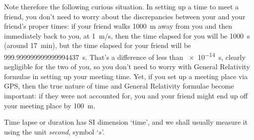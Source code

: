 \documentclass[a4paper,12pt,%
onecolumn,oneside,%
british%
]{memoir}
\renewcommand*{\|}[1][]{\nonscript\:#1\vert\nonscript\:\mathopen{}}
\newcommand*{\yc}{c} %
\begin{document}
Note therefore the following curious situation. In setting up a time to meet a friend, you don't need to worry about the discrepancies between your and your friend's proper times: if your friend walks \qty{1000}{m} away from you and then immediately back to you, at \qty{1}{m/s}, then the time elapsed for you will be \qty{1000}{s} (around \qty{17}{min}), but the time elapsed for your friend will be \qty{999.999999999999994437}{s}. That's a difference of less than \qty{e-14}{s}, clearly negligible for the two of you, so you don't need to worry with General Relativity formulae in setting up your meeting time. Yet, if you set up a meeting place via GPS, then the true nature of time and General Relativity formulae become important: if they were not accounted for, you and your friend might end up off your meeting place by \qty{100}{m}.

Time lapse or duration has SI dimension \enquote*{\textsf{time}}, and we shall usually measure it using the unit \emph{second}, symbol \enquote*{$\unit{s}$}.

\end{document}
